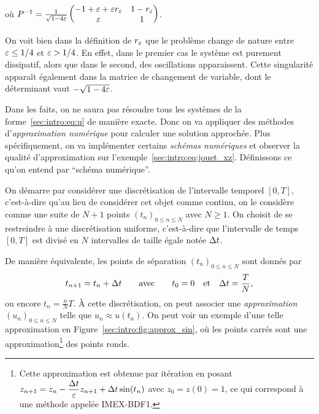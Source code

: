 où $P^{-1} = \frac{1}{\sqrt{1 - 4\varepsilon}} \begin{pmatrix}
    -1 + \varepsilon + \varepsilon r_{\varepsilon}  &  1 - r_{\varepsilon} \\
                \varepsilon         &      1
\end{pmatrix}$.
\begin{FRremark*}
    On voit bien dans la définition de $r_{\varepsilon}$ que le problème change de nature entre $\varepsilon \leq 1/4$ et $\varepsilon > 1/4$. En effet, dans le premier cas le système est purement dissipatif, alors que dans le second, des oscillations apparaissent. Cette singularité apparaît également dans la matrice de changement de variable, dont le déterminant vaut $-\sqrt{1 - 4\varepsilon}$.
\end{FRremark*}


Dans les faits, on ne saura pas résoudre tous les systèmes de la forme~\eqref{sec:intro:eq:u} de manière exacte. Donc on va appliquer des méthodes d'\textit{approximation numérique} pour calculer une solution approchée. Plus spécifiquement, on va implémenter certains \textit{schémas numériques} et observer la qualité d'approximation sur l'exemple~\eqref{sec:intro:eq:jouet_xz}. Définissons ce qu'on entend par \enquote{schéma numérique}. 

On démarre par considérer une discrétisation de l'intervalle temporel $[0,T]$, c'est-à-dire qu'au lieu de considérer cet objet comme continu, on le considère comme une suite de $N+1$ points $(t_n)_{0 \leq n \leq N}$ avec $N \geq 1$. On choisit de se restreindre à une discrétisation uniforme, c'est-à-dire que l'intervalle de temps $[0,T]$ est divisé en $N$ intervalles de taille égale notée $\Delta t$. 
\begin{center}\end{center}
\vspace*{-12pt}
%
\noindent%
De manière équivalente, les points de séparation $(t_n)_{0 \leq n \leq N}$ sont donnés par 
\begin{equation*}
    t_{n+1} = t_n + \Delta t
    \qquad\text{avec}\qquad
    t_0 = 0 \quad\text{et}\quad \Delta t = \frac{T}{N} ,
\end{equation*}
ou encore $t_n = \frac{n}{N}T$. À cette discrétisation, on peut associer une \textit{approximation} $(u_n)_{0 \leq n \leq N}$ telle que $u_n \approx u(t_n)$. On peut voir un exemple d'une telle approximation en Figure~\ref{sec:intro:fig:approx_sin}, où les points carrés sont une approximation\footnote{Cette approximation est obtenue par itération en posant $\displaystyle z_{n+1} = z_n - \frac{\Delta t}{\varepsilon}z_{n+1} + \Delta t \sin(t_n)$ avec $z_0 = z(0) = 1$, ce qui correspond à une méthode appelée IMEX-BDF1.} des points ronds. 

